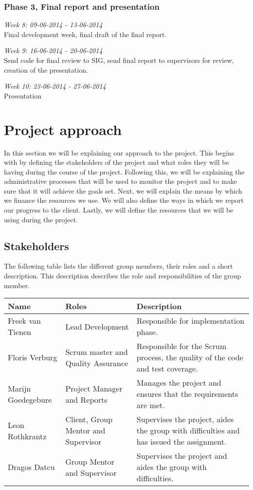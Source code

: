\subsubsection*{Phase 3, Final report and presentation}

\noindent\emph{Week 8: 09-06-2014 - 13-06-2014}\\
Final development week, final draft of the final report.

\noindent\emph{Week 9: 16-06-2014 - 20-06-2014}\\
Send code for final review to SIG, send final report to supervisors for review, creation of the presentation.

\noindent\emph{Week 10: 23-06-2014 - 27-06-2014}\\
Presentation
\section*{Project approach}
In this section we will be explaining our approach to the project.
This begins with by defining the stakeholders of the project and what roles they will be having during the course of the project.
Following this, we will be explaining the administrative processes that will be used to monitor the project and to make sure that it will achieve the goals set.
Next, we will explain the means by which we finance the resources we use.
We will also define the ways in which we report our progress to the client.
Lastly, we will define the resources that we will be using during the project.

\subsection*{Stakeholders}
The following table lists the different group members, their roles and a short description.
This description describes the role and responsibilities of the group member.\\
\begin{tabular}{|l|l|p{5cm}|}
\hline
Name & Roles & Description\\
\hline
Freek van Tienen & Lead Development & Responsible for implementation phase.\\
\hline
Floris Verburg & Scrum master and Quality Assurance & Responsible for the Scrum process, the quality of the code and test coverage.\\
\hline
Marijn Goedegebure & Project Manager and Reports & Manages the project and ensures that the requirements are met.\\
\hline
Leon Rothkrantz & Client, Group Mentor and Supervisor & Supervises the project, aides the group with difficulties and has issued the assignment.\\
\hline
Dragos Datcu &  Group Mentor and Supervisor & Supervises the project and aides the group with difficulties.\\
\hline
\end{tabular}

